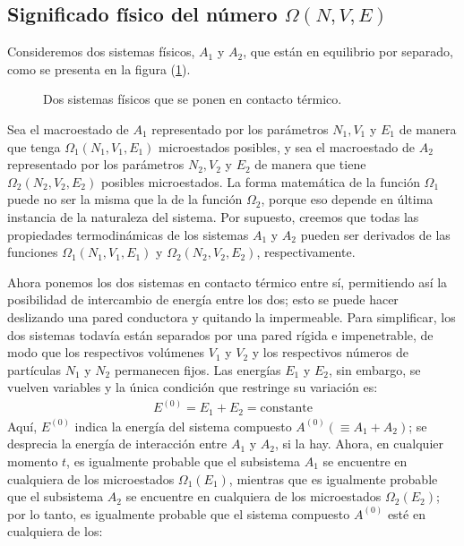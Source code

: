 \subsection{Significado físico del número \texorpdfstring{$\Omega (N, V, E)$}{O (N,V,E).}}

Consideremos dos sistemas físicos, $A_{1}$ y $A_{2}$, que están en equilibrio por separado, como se presenta en la figura (\ref{fig:figura_01_01}).
\begin{figure}[H]
    \centering
    \caption{Dos sistemas físicos que se ponen en contacto térmico.}
    \label{fig:figura_01_01}
\end{figure}
Sea el macroestado de $A_{1}$ representado por los parámetros $N_{1}, V_{1}$ y $E_{1}$ de manera que tenga $\Omega_{1} (N_{1}, V_{1}, E_{1})$ microestados posibles, y sea el macroestado de $A_{2}$ representado por los parámetros $N_{2}, V_{2}$ y $E_{2}$ de manera que tiene $\Omega_{2} (N_{2}, V_{2}, E_{2})$ posibles microestados. La forma matemática de la función $\Omega_{1}$ puede no ser la misma que la de la función $\Omega_{2}$, porque eso depende en última instancia de la naturaleza del sistema. Por supuesto, creemos que todas las propiedades termodinámicas de los sistemas $A_{1}$ y $A_{2}$ pueden ser derivados de las funciones $\Omega_{1} (N_{1}, V_{1}, E_{1})$ y $\Omega_{2} (N_{2}, V_{2}, E_{2})$, respectivamente.
\par
Ahora ponemos los dos sistemas en contacto térmico entre sí, permitiendo así la posibilidad de intercambio de energía entre los dos; esto se puede hacer deslizando una pared conductora y quitando la impermeable. Para simplificar, los dos sistemas todavía están separados por una pared rígida e impenetrable, de modo que los respectivos volúmenes $V_{1}$ y $V_{2}$ y los respectivos números de partículas $N_{1}$ y $N_{2}$ permanecen fijos. Las energías $E_{1}$ y $E_{2}$, sin embargo, se vuelven variables y la única condición que restringe su variación es:
\begin{align}
E^{(0)} = E_{1} + E_{2} = \text{constante}
\label{eq:ecuacion_02_01}
\end{align}
Aquí, $E^{(0)}$ indica la energía del sistema compuesto $A^{(0)} (\equiv A_{1} + A_{2})$; se desprecia la energía de interacción entre $A_{1}$ y $A_{2}$, si la hay. Ahora, en cualquier momento $t$, es igualmente probable que el subsistema $A_{1}$ se encuentre en cualquiera de los microestados $\Omega_{1} (E_{1})$, mientras que es igualmente probable que el subsistema $A_{2}$ se encuentre en cualquiera de los microestados $\Omega_{2} (E_{2})$; por lo tanto, es igualmente probable que el sistema compuesto $A^{(0)}$ esté en cualquiera de los:
